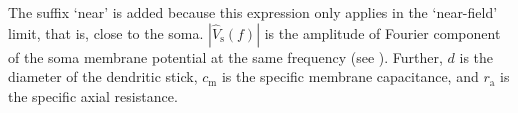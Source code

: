 The suffix `near' is added because this expression only applies in the `near-field' limit, that is,
close to the soma. $|\hat{V}_\mathrm{s}(f)|$ is the amplitude of Fourier component of the soma membrane potential at the same
frequency (see ). Further, $d$ is the diameter of the dendritic
stick, $c_\mathrm{m}$ is the specific membrane capacitance, and $r_\mathrm{a}$ is the specific axial resistance.  


